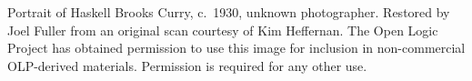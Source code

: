Portrait of Haskell Brooks Curry, c.~1930, unknown
photographer. Restored by Joel Fuller from an original scan courtesy
of Kim Heffernan. The Open Logic Project has obtained permission to
use this image for inclusion in non-commercial OLP-derived materials.
Permission is required for any other use.
